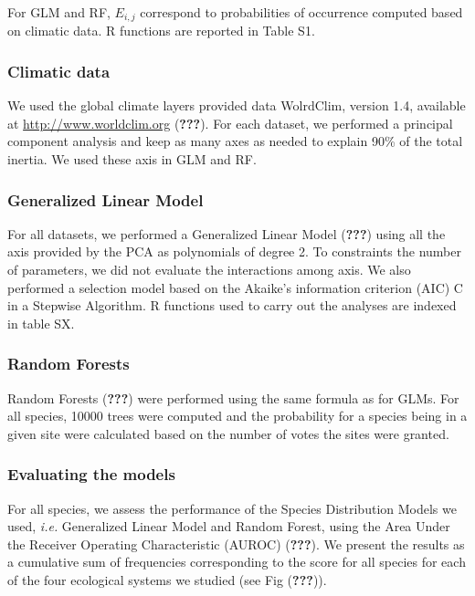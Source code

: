 For GLM and RF, \(E_{i,j}\) correspond to probabilities of occurrence
computed based on climatic data. R functions are reported in Table S1.

\subsubsection{Climatic data}\label{climatic-data}

We used the global climate layers provided data WolrdClim, version 1.4,
available at \url{http://www.worldclim.org} ({\textbf{???}}). For each
dataset, we performed a principal component analysis and keep as many
axes as needed to explain 90\% of the total inertia. We used these axis
in GLM and RF.

\subsubsection{Generalized Linear Model}\label{generalized-linear-model}

For all datasets, we performed a Generalized Linear Model
({\textbf{???}}) using all the axis provided by the PCA as polynomials
of degree 2. To constraints the number of parameters, we did not
evaluate the interactions among axis. We also performed a selection
model based on the Akaike's information criterion (AIC) C in a Stepwise
Algorithm. R functions used to carry out the analyses are indexed in
table SX.

\subsubsection{Random Forests}\label{random-forests}

Random Forests ({\textbf{???}}) were performed using the same formula as
for GLMs. For all species, 10000 trees were computed and the probability
for a species being in a given site were calculated based on the number
of votes the sites were granted.

\subsubsection{Evaluating the models}\label{evaluating-the-models}

For all species, we assess the performance of the Species Distribution
Models we used, \emph{i.e.} Generalized Linear Model and Random Forest,
using the Area Under the Receiver Operating Characteristic (AUROC)
({\textbf{???}}). We present the results as a cumulative sum of
frequencies corresponding to the score for all species for each of the
four ecological systems we studied (see Fig ({\textbf{???}})).

